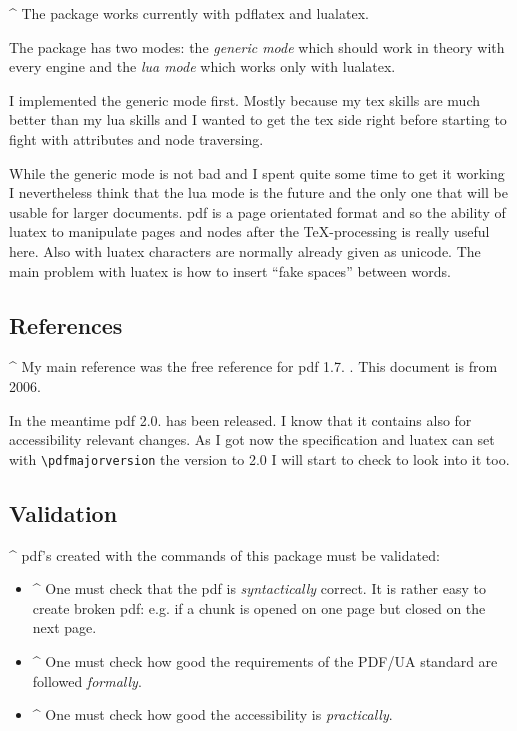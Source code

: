 \documentclass[DIV=12,parskip=half-,bibliography=totoc]{scrartcl}
\begin{document}
\TagP^ The package works currently with pdflatex and lualatex.

\TagP The package has two modes: the \emph{generic mode} which should work in theory with every engine and the \emph{lua mode} which works only with lualatex.


\TagP I implemented the generic mode first. Mostly because my tex skills are much better than my lua skills and I wanted to get the tex side right before starting to fight with attributes and node traversing.

\TagP While the generic mode is not bad and I spent quite some time to get it working I nevertheless think that the lua mode is the future and the only one that will be usable for larger documents. pdf is a page orientated format and so the ability of luatex to manipulate pages and nodes after the \TeX-processing is really useful here. Also with luatex characters are normally already given as unicode. The main problem with luatex is how to insert \enquote{fake spaces} between words.%
\TagPend



\subsection{References}

\TagP^ My main reference was the free reference for pdf 1.7. \parencite{pdfreference}. This document is from 2006.

\TagP In the meantime pdf 2.0. has been released. I know that it contains also for accessibility relevant changes. As I got now the specification and luatex can set with \verb+\pdfmajorversion+ the version to 2.0 I will start to check to look into it too.%
\TagPend

\subsection{Validation}

\TagP^ pdf's created with the commands of this package must be validated:\TagPend


\begin{itemize}
\item \TagP^ One must check that the pdf is \emph{syntactically} correct. It is rather easy to create broken pdf: e.g. if a chunk is opened on one page but closed on the next page.
    \Pmeti
\item \TagP^ One must check how good the requirements of the PDF/UA standard are followed \emph{formally}.
    \Pmeti
\item \TagP^ One must check how good the accessibility is \emph{practically}.\Pmeti
\end{itemize}
\end{document}
